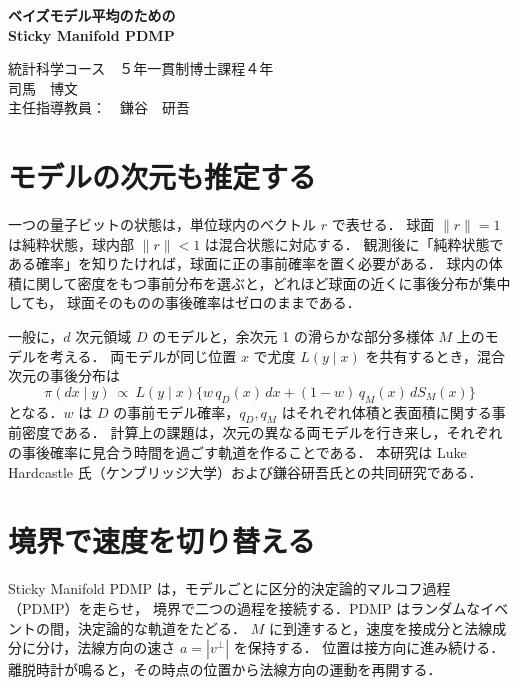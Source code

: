 \documentclass[leqno,a4j]{jarticle}
\numberwithin{equation}{section}
\begin{document}
\normalsize

\begin{center}

\textbf{\huge{ベイズモデル平均のための\\Sticky Manifold PDMP}}
\vspace{0.5cm}

\large{統計科学コース　５年一貫制博士課程４年\\

司馬　博文
\vspace{0.2cm}\\ 
\normalsize{主任指導教員：　鎌谷　研吾}

}

\end{center}


\section{モデルの次元も推定する}
一つの量子ビットの状態は，単位球内のベクトル $r$ で表せる．
球面 $\|r\|=1$ は純粋状態，球内部 $\|r\|<1$ は混合状態に対応する．
観測後に「純粋状態である確率」を知りたければ，球面に正の事前確率を置く必要がある．
球内の体積に関して密度をもつ事前分布を選ぶと，どれほど球面の近くに事後分布が集中しても，
球面そのものの事後確率はゼロのままである．

一般に，$d$ 次元領域 $D$ のモデルと，余次元 1 の滑らかな部分多様体 $M$ 上のモデルを考える．
両モデルが同じ位置 $x$ で尤度 $L(y\mid x)$ を共有するとき，混合次元の事後分布は
\begin{equation}
 \pi(dx\mid y)\ \propto\ L(y\mid x)
 \bigl\{w\,q_D(x)\,dx+(1-w)\,q_M(x)\,dS_M(x)\bigr\}
 \label{eq:posterior}
\end{equation}
となる．$w$ は $D$ の事前モデル確率，$q_D,q_M$ はそれぞれ体積と表面積に関する事前密度である．
計算上の課題は，次元の異なる両モデルを行き来し，それぞれの事後確率に見合う時間を過ごす軌道を作ることである．
本研究は Luke Hardcastle 氏（ケンブリッジ大学）および鎌谷研吾氏との共同研究である．

\section{境界で速度を切り替える}
Sticky Manifold PDMP は，モデルごとに区分的決定論的マルコフ過程（PDMP）を走らせ，
境界で二つの過程を接続する．PDMP はランダムなイベントの間，決定論的な軌道をたどる．
$M$ に到達すると，速度を接成分と法線成分に分け，法線方向の速さ $a=|v^\perp|$ を保持する．
位置は接方向に進み続ける．離脱時計が鳴ると，その時点の位置から法線方向の運動を再開する．
\end{document}
